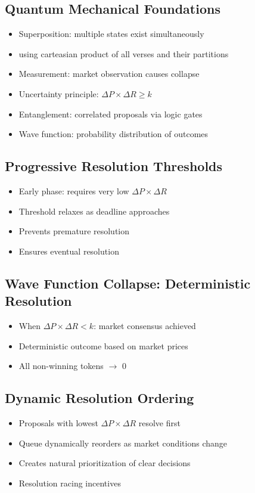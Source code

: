 \documentclass{article}
\begin{document}
\subsection{Quantum Mechanical Foundations}
\begin{itemize}
    \item Superposition: multiple states exist simultaneously
    \item using carteasian product of all verses and their partitions
    \item Measurement: market observation causes collapse
    \item Uncertainty principle: $\Delta P \times \Delta R \geq k$
    \item Entanglement: correlated proposals via logic gates
    \item Wave function: probability distribution of outcomes
\end{itemize}

\subsection{Progressive Resolution Thresholds}
\begin{itemize}
    \item Early phase: requires very low $\Delta P \times \Delta R$
    \item Threshold relaxes as deadline approaches
    \item Prevents premature resolution
    \item Ensures eventual resolution
\end{itemize}

\subsection{Wave Function Collapse: Deterministic Resolution}
\begin{itemize}
   \item When $\Delta P \times \Delta R < k$: market consensus achieved
   \item Deterministic outcome based on market prices
   \item All non-winning tokens $\rightarrow$ 0
\end{itemize}

\subsection{Dynamic Resolution Ordering}
\begin{itemize}
    \item Proposals with lowest $\Delta P \times \Delta R$ resolve first
    \item Queue dynamically reorders as market conditions change
    \item Creates natural prioritization of clear decisions
    \item Resolution racing incentives
\end{itemize}
\end{document}
